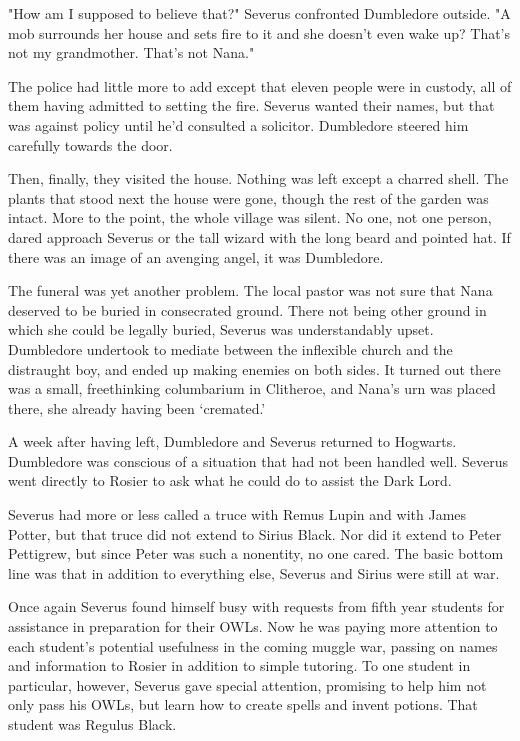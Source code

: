 "How am I supposed to believe that?" Severus confronted Dumbledore outside. "A mob surrounds her house and sets fire to it and she doesn't even wake up? That's not my grandmother. That's not Nana."

The police had little more to add except that eleven people were in custody, all of them having admitted to setting the fire. Severus wanted their names, but that was against policy until he'd consulted a solicitor. Dumbledore steered him carefully towards the door.

Then, finally, they visited the house. Nothing was left except a charred shell. The plants that stood next the house were gone, though the rest of the garden was intact. More to the point, the whole village was silent. No one, not one person, dared approach Severus or the tall wizard with the long beard and pointed hat. If there was an image of an avenging angel, it was Dumbledore.

The funeral was yet another problem. The local pastor was not sure that Nana deserved to be buried in consecrated ground. There not being other ground in which she could be legally buried, Severus was understandably upset. Dumbledore undertook to mediate between the inflexible church and the distraught boy, and ended up making enemies on both sides. It turned out there was a small, freethinking columbarium in Clitheroe, and Nana's urn was placed there, she already having been `cremated.'

A week after having left, Dumbledore and Severus returned to Hogwarts. Dumbledore was conscious of a situation that had not been handled well. Severus went directly to Rosier to ask what he could do to assist the Dark Lord.

Severus had more or less called a truce with Remus Lupin and with James Potter, but that truce did not extend to Sirius Black. Nor did it extend to Peter Pettigrew, but since Peter was such a nonentity, no one cared. The basic bottom line was that in addition to everything else, Severus and Sirius were still at war.

Once again Severus found himself busy with requests from fifth year students for assistance in preparation for their OWLs. Now he was paying more attention to each student's potential usefulness in the coming muggle war, passing on names and information to Rosier in addition to simple tutoring. To one student in particular, however, Severus gave special attention, promising to help him not only pass his OWLs, but learn how to create spells and invent potions. That student was Regulus Black.

